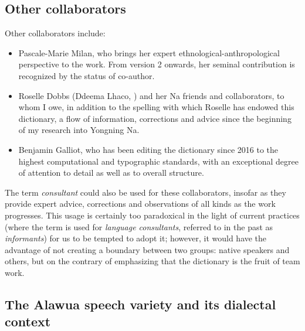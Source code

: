 \subsection{Other collaborators}

Other collaborators include:

\begin{itemize}
    \item Pascale-Marie Milan, who brings her expert ethnological-anthropological perspective to the work. From version 2 onwards, her seminal contribution is recognized by the status of co-author.
    \item Roselle Dobbs (Ddeema Lhaco, ) and her Na friends and collaborators, to whom I owe, in addition to the spelling with which Roselle has endowed this dictionary, a flow of information, corrections and advice since the beginning of my research into Yongning Na.
    \item Benjamin Galliot, who has been editing the dictionary since 2016 to the highest computational and typographic standards, with an exceptional degree of attention to detail as well as to overall structure.
\end{itemize}

The term \emph{consultant} could also be used for these collaborators, insofar as they provide expert advice, corrections and observations of all kinds as the work progresses. This usage is certainly too paradoxical in the light of current practices (where the term is used for \emph{language consultants}, referred to in the past as \emph{informants}) for us to be tempted to adopt it; however, it would have the advantage of not creating a boundary between two groups: native speakers and others, but on the contrary of emphasizing that the dictionary is the fruit of team work.

\subsection{The Alawua speech variety and its dialectal context}

